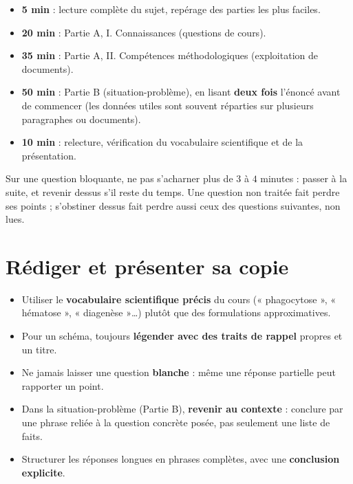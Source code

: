 \begin{propriete}
\begin{itemize}
\item \textbf{5 min} : lecture complète du sujet, repérage des parties les plus
faciles.
\item \textbf{20 min} : Partie A, I. Connaissances (questions de cours).
\item \textbf{35 min} : Partie A, II. Compétences méthodologiques (exploitation de
documents).
\item \textbf{50 min} : Partie B (situation-problème), en lisant \textbf{deux fois}
l'énoncé avant de commencer (les données utiles sont souvent réparties sur plusieurs
paragraphes ou documents).
\item \textbf{10 min} : relecture, vérification du vocabulaire scientifique et de la
présentation.
\end{itemize}
\end{propriete}

\begin{remarque}
Sur une question bloquante, ne pas s'acharner plus de $3$ à $4$ minutes : passer à la
suite, et revenir dessus s'il reste du temps. Une question non traitée fait perdre ses
points ; s'obstiner dessus fait perdre aussi ceux des questions suivantes, non lues.
\end{remarque}

\section{Rédiger et présenter sa copie}

\begin{propriete}
\begin{itemize}
\item Utiliser le \textbf{vocabulaire scientifique précis} du cours (« phagocytose »,
« hématose », « diagenèse »\dots) plutôt que des formulations approximatives.
\item Pour un schéma, toujours \textbf{légender avec des traits de rappel} propres et
un titre.
\item Ne jamais laisser une question \textbf{blanche} : même une réponse partielle
peut rapporter un point.
\item Dans la situation-problème (Partie B), \textbf{revenir au contexte} : conclure
par une phrase reliée à la question concrète posée, pas seulement une liste de faits.
\item Structurer les réponses longues en phrases complètes, avec une
\textbf{conclusion explicite}.
\end{itemize}
\end{propriete}

